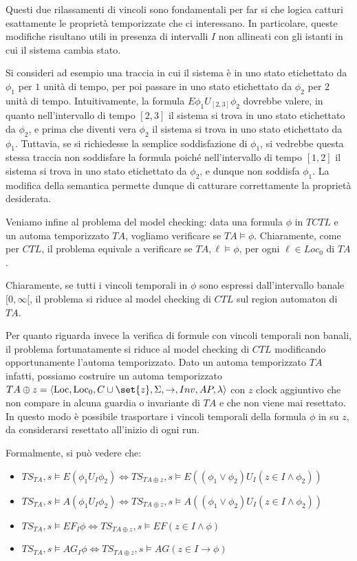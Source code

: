 Questi due rilassamenti di vincoli sono fondamentali per far si che logica catturi esattamente le proprietà temporizzate che ci interessano. In particolare, queste modifiche risultano utili in presenza di intervalli \(I\) non allineati con gli istanti in cui il sistema cambia stato.

Si consideri ad esempio una traccia in cui il sistema è in uno stato etichettato da \(\phi_1\) per \(1\) unità di tempo, per poi passare in uno stato etichettato da \(\phi_2\) per \(2\) unità di tempo. Intuitivamente, la formula \(E\phi_1 U_{[2,3]} \phi_2\) dovrebbe valere, in quanto nell'intervallo di tempo \([2,3]\) il sistema si trova in uno stato etichettato da \(\phi_2\), e prima che diventi vera \(\phi_2\) il sistema si trova in uno stato etichettato da \(\phi_1\). Tuttavia, se si richiedesse la semplice soddisfazione di \(\phi_1\), si vedrebbe questa stessa traccia non soddisfare la formula poiché nell'intervallo di tempo \([1,2]\) il sistema si trova in uno stato etichettato da \(\phi_2\), e dunque non soddisfa \(\phi_1\). La modifica della semantica permette dunque di catturare correttamente la proprietà desiderata.

Veniamo infine al problema del model checking: data una formula \(\phi\) in \(TCTL\) e un automa temporizzato \(TA\), vogliamo verificare se \(TA \models \phi\). Chiaramente, come per \(CTL\), il problema equivale a verificare se \(TA, \ell \models \phi\), per ogni \(\ell \in Loc_0\) di \(TA\).

Chiaramente, se tutti i vincoli temporali in \(\phi\) sono espressi dall'intervallo banale \([0,\infty[\), il problema si riduce al model checking di \(CTL\) sul region automaton di \(TA\).

Per quanto riguarda invece la verifica di formule con vincoli temporali non banali, il problema fortunatamente si riduce al model checking di \(CTL\) modificando opportunamente l'automa temporizzato. Dato un automa temporizzato \(TA\) infatti, possiamo costruire un automa temporizzato \(TA\oplus z = \langle \Loc , \Loc_0, C \cup \set{z}, \Sigma, \to, Inv,AP,\lambda \rangle\) con \(z\) clock aggiuntivo che non compare in alcuna guardia o invariante di \(TA\) e che non viene mai resettato. In questo modo è possibile trasportare i vincoli temporali della formula \(\phi\) in  su \(z\), da considerarsi resettato all'inizio di ogni run. 

Formalmente, si può vedere che:
\begin{itemize}
  \item \(TS_{TA},s\models E(\phi_1 U_I \phi_2) \iff TS_{TA\oplus z},s\models E((\phi_1\lor \phi_2) U_I (z \in I \land \phi_2))\)
  \item \(TS_{TA},s\models A(\phi_1 U_I \phi_2) \iff TS_{TA\oplus z},s\models A((\phi_1\lor \phi_2) U_I (z \in I \land \phi_2))\)
  \item \(TS_{TA},s\models EF_I \phi \iff TS_{TA\oplus z},s\models EF(z \in I \land \phi)\)
  \item \(TS_{TA},s\models AG_I \phi \iff TS_{TA\oplus z},s\models AG(z \in I \to \phi)\)
\end{itemize}

